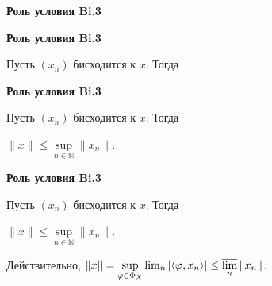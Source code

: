 \documentclass[11pt]{article}
\newcommand{\N}{\mathbb{N}}
\let\ph\varphi
\begin{document}
\newpage

\begin{center}
{\color{notaeYELLOW}\bfseries\fontsize{44}{52}\selectfont Роль условия Bi.3}
\end{center}
\vspace*{\fill}
\begin{center}
\fontsize{36}{43}\selectfont
\end{center}
\vspace*{\fill}

\newpage

\begin{center}
{\color{notaeYELLOW}\bfseries\fontsize{44}{52}\selectfont Роль условия Bi.3}
\end{center}
\vspace*{\fill}
\begin{center}
\fontsize{36}{43}\selectfont
\parbox{\linewidth}{\centering\noindent Пусть $(x_n)$ бисходится к $x$. Тогда
\par}\vspace{0.4in}
\end{center}
\vspace*{\fill}

\newpage

\begin{center}
{\color{notaeYELLOW}\bfseries\fontsize{44}{52}\selectfont Роль условия Bi.3}
\end{center}
\vspace*{\fill}
\begin{center}
\fontsize{36}{43}\selectfont
\parbox{\linewidth}{\centering\noindent Пусть $(x_n)$ бисходится к $x$. Тогда
\par}\vspace{0.4in}
\parbox{\linewidth}{\centering\noindent $\|x\|\le\sup\limits_{n\in\N}\|x_n\|.$
\par}\vspace{0.4in}
\end{center}
\vspace*{\fill}

\newpage

\begin{center}
{\color{notaeYELLOW}\bfseries\fontsize{44}{52}\selectfont Роль условия Bi.3}
\end{center}
\vspace*{\fill}
\begin{center}
\fontsize{36}{43}\selectfont
\parbox{\linewidth}{\centering\noindent Пусть $(x_n)$ бисходится к $x$. Тогда
\par}\vspace{0.4in}
\parbox{\linewidth}{\centering\noindent $\|x\|\le\sup\limits_{n\in\N}\|x_n\|.$
\par}\vspace{0.4in}
\parbox{\linewidth}{\centering\noindent Действительно, $\|x\|=\sup\limits_{\ph\in\Phi_X}\lim_n|\langle\ph,x_n\rangle|\le\varlimsup\limits_n\|x_n\|$.
\par}\vspace{0.4in}
\end{center}
\vspace*{\fill}
\end{document}
